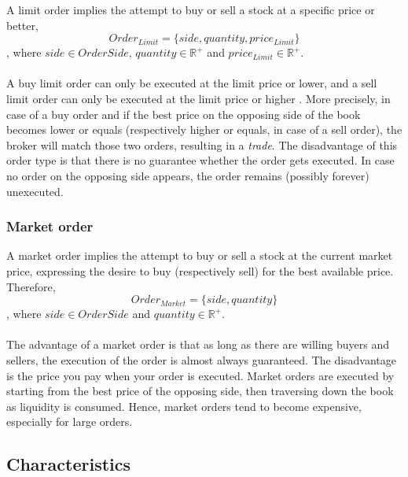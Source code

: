 A limit order implies the attempt to buy or sell a stock at a specific price or better,
\begin{equation}\label{eq:order-limit}
    Order_{Limit}=\{side, quantity, price_{Limit}\}
\end{equation}
, where $side \in OrderSide$, $quantity \in \mathbb{R^+}$ and $price_{Limit} \in \mathbb{R^+}$.
\\
\\
A buy limit order can only be executed at the limit price or lower, and a sell limit order can only be executed at the limit price or higher \cite{sec-limit-order}.
More precisely, in case of a buy order and if the best price on the opposing side of the book becomes lower or equals (respectively higher or equals, in case of a sell order), the broker will match those two orders, resulting in a \textit{trade}.
The disadvantage of this order type is that there is no guarantee whether the order gets executed.
In case no order on the opposing side appears, the order remains (possibly forever) unexecuted.

\subsubsection{Market order}
\label{sec:market-order}

A market order implies the attempt to buy or sell a stock at the current market price, expressing the desire to buy (respectively sell) for the best available price. Therefore,
\begin{equation}
Order_{Market}=\{side, quantity\}
\end{equation}
, where $side \in OrderSide$ and $quantity \in \mathbb{R^+}$.
\\
\\
The advantage of a market order is that as long as there are willing buyers and sellers, the execution of the order is almost always guaranteed. \cite{sec-market-order}
The disadvantage is the price you pay when your order is executed.
Market orders are executed by starting from the best price of the opposing side, then traversing down the book as liquidity is consumed. 
Hence, market orders tend to become expensive, especially for large orders.

\subsection{Characteristics}
\label{sec:ob-characteristics}

